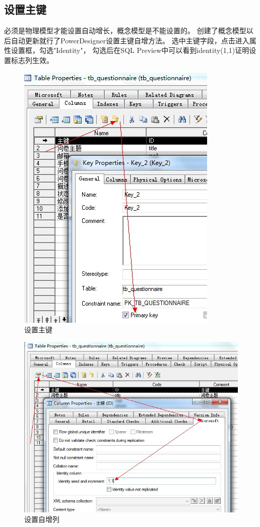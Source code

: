 \documentclass{book}
\begin{document}
\subsection{设置主键}

必须是物理模型才能设置自动增长，概念模型是不能设置的。
创建了概念模型以后自动更新就行了PowerDesigner设置主键自增方法。
选中主键字段，点击进入属性设置框，勾选"Identity"，
勾选后在SQL Preview中可以看到identity(1,1)证明设置标志列生效。

\begin{figure}[htbp]
	\centering
	\includegraphics[scale=0.8]{PDSetPrimaryKey.jpg}
	\caption{设置主键}
	\label{fig:PDSetPrimaryKey}
\end{figure}

\begin{figure}[htbp]
	\centering
	\includegraphics[scale=0.8]{PDSetIdentifyColumn.jpg}
	\caption{设置自增列}
	\label{fig:PDSetIdentifyColumn}
\end{figure}
\end{document}
